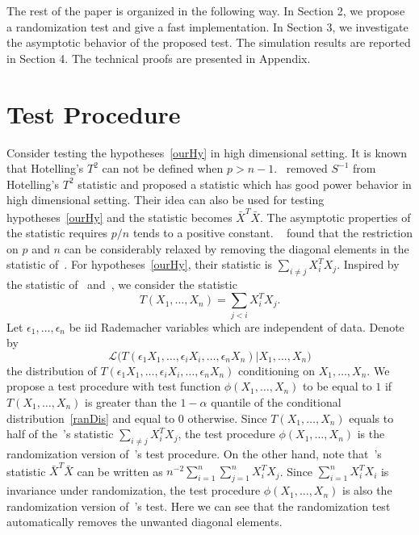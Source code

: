 \documentclass[smallcondensed,final,natbib]{svjour3}          %
\begin{document}






The rest of the paper is organized in the following way. In Section 2, we propose a randomization test and give a fast implementation.  In Section 3, we investigate the asymptotic behavior of the proposed test. The simulation results are reported in Section 4. The technical proofs are presented in Appendix.




\section{Test Procedure}
Consider testing the hypotheses~\eqref{ourHy} in high dimensional setting.
It is known that Hotelling's $T^2$ can not be defined when $p> n-1$.~\citet{Bai1996Efiect} removed $S^{-1}$ from Hotelling's $T^2$ statistic and proposed a statistic which has good power behavior in high dimensional setting.
Their idea can also be used for testing hypotheses~\eqref{ourHy} and the statistic becomes $\bar{X}^T \bar{X}$.
The asymptotic properties of the statistic requires $p/n$ tends to a positive constant.
 ~\citet{Chen2010A} found that the restriction on $p$ and $n$ can be considerably relaxed by removing the diagonal elements in the statistic of~\citet{Bai1996Efiect}.
 For hypotheses~\eqref{ourHy}, their statistic is $\sum_{i \neq j}X_i^T X_j$.
 Inspired by the statistic of~\citet{Bai1996Efiect} and~\citet{Chen2010A}, we consider the statistic
\begin{equation}\label{Statistic}
    T(X_1,\ldots,X_n)=\sum_{j<i}X_i^T X_j.
\end{equation}
Let $\epsilon_1,\ldots,\epsilon_n$ be iid Rademacher variables which are independent of data. Denote by
\begin{equation}\label{ranDis}
    \mathcal{L}\big(T(\epsilon_1 X_1,\ldots,\epsilon_i X_i,\ldots,\epsilon_n X_n)|X_1,\ldots,X_n\big)
\end{equation}
the distribution of $T(\epsilon_1 X_1,\ldots,\epsilon_i X_i,\ldots,\epsilon_n X_n)$ conditioning on $X_1,\ldots,X_n$.
We propose a test procedure with test function $\phi(X_1,\ldots,X_n)$ to be equal to $1$ if $T(X_1,\ldots, X_n)$ is greater than the $1-\alpha$ quantile of the conditional distribution~\eqref{ranDis} and equal to $0$ otherwise.
 Since $T(X_1,\ldots,X_n)$ equals to half of the~\citet{Chen2010A}'s statistic $\sum_{i\neq j}X_i^T X_j$, the test procedure $\phi(X_1,\ldots,X_n)$ is the randomization version of~\citet{Chen2010A}'s test procedure.
 On the other hand,
 note that~\citet{Bai1996Efiect}'s statistic $\bar{X}^T \bar{X}$ can be written as $n^{-2}\sum_{i=1}^n\sum_{j=1}^n X_i^T X_j$.
 Since $\sum_{i=1}^n X_i^T X_i$ is invariance under randomization, the test procedure $\phi(X_1,\ldots,X_n)$ is also the randomization version of~\citet{Bai1996Efiect}'s test.
 Here we can see that the randomization test automatically removes the unwanted diagonal elements.
\end{document}

